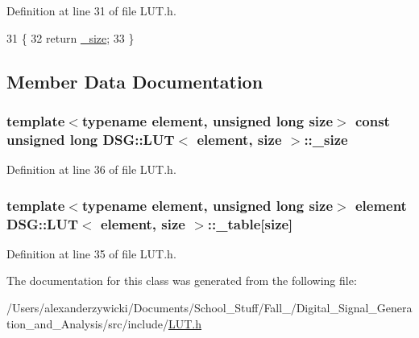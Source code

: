 Definition at line 31 of file L\+U\+T.\+h.


\begin{DoxyCode}
31                                             \{
32                 \textcolor{keywordflow}{return} \hyperlink{classDSG_1_1LUT_a87c352b5eaea2188955213c0f4ae9799}{\_size};
33             \}
\end{DoxyCode}


\subsection{Member Data Documentation}
\hypertarget{classDSG_1_1LUT_a87c352b5eaea2188955213c0f4ae9799}{
\subsubsection[{\+\_\+size}]{\setlength{\rightskip}{0pt plus 5cm}template$<$typename element, unsigned long size$>$ const unsigned long {\bf D\+S\+G\+::\+L\+U\+T}$<$ element, size $>$\+::\+\_\+size\hspace{0.3cm}{\ttfamily [protected]}}}\label{classDSG_1_1LUT_a87c352b5eaea2188955213c0f4ae9799}


Definition at line 36 of file L\+U\+T.\+h.

\hypertarget{classDSG_1_1LUT_ac8b23bbb7ce259d4ceb1c6fa93a7f29f}{
\subsubsection[{\+\_\+table}]{\setlength{\rightskip}{0pt plus 5cm}template$<$typename element, unsigned long size$>$ element {\bf D\+S\+G\+::\+L\+U\+T}$<$ element, size $>$\+::\+\_\+table\mbox{[}size\mbox{]}\hspace{0.3cm}{\ttfamily [protected]}}}\label{classDSG_1_1LUT_ac8b23bbb7ce259d4ceb1c6fa93a7f29f}


Definition at line 35 of file L\+U\+T.\+h.



The documentation for this class was generated from the following file\+:\begin{DoxyCompactItemize}
\item 
/\+Users/alexanderzywicki/\+Documents/\+School\+\_\+\+Stuff/\+Fall\+\_/\+Digital\+\_\+\+Signal\+\_\+\+Generation\+\_\+and\+\_\+\+Analysis/src/include/\hyperlink{LUT_8h}{L\+U\+T.\+h}\end{DoxyCompactItemize}

